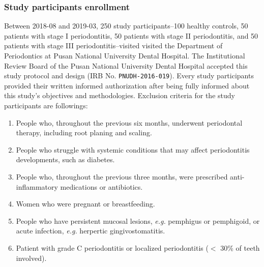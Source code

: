 \documentclass[11pt, a4paper, onecolumn, oneside]{report}
\begin{document}
            \subsubsection{Study participants enrollment}
                Between 2018-08 and 2019-03, 250 study participants--100 healthy controls, 50 patients with stage I periodontitis, 50 patients with stage II periodontitis, and 50 patients with stage III periodontitis--visited visited the Department of Periodontics at Pusan National University Dental Hospital. The Institutional Review Board of the Pusan National University Dental Hospital accepted this study protocol and design (IRB No. \texttt{PNUDH-2016-019}). Every study participants provided their written informed authorization after being fully informed about this study's objectives and methodologies. Exclusion criteria for the study participants are followings:
                \begin{enumerate}
                    \item People who, throughout the previous six months, underwent periodontal therapy, including root planing and scaling.
                    \item People who struggle with systemic conditions that may affect periodontitis developments, such as diabetes.
                    \item People who, throughout the previous three months, were prescribed anti-inflammatory medications or antibiotics.
                    \item Women who were pregnant or breastfeeding.
                    \item People who have persistent mucosal lesions, \textit{e.g.} pemphigus or pemphigoid, or acute infection, \textit{e.g.} herpertic gingivostomatitis.
                    \item Patient with grade C periodontitis or localized periodontitis ($<$ 30\% of teeth involved).
                \end{enumerate}
\end{document}
